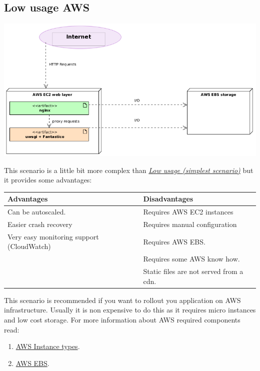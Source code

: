 \documentclass[letterpaper,10pt,english]{sphinxmanual}
\begin{document}
\subsection{Low usage AWS}
\label{how_to/deployment/aws_low_usage_scenario:low-usage-aws}\label{how_to/deployment/aws_low_usage_scenario::doc}
\includegraphics{low_usage_aws.png}

This scenario is a little bit more complex than {\hyperref[how_to/deployment/low_usage_scenario::doc]{\emph{Low usage (simplest scenario)}}} but it provides some
advantages:

\begin{tabulary}{\linewidth}{|L|L|}
\hline
\textbf{\relax 
Advantages
} & \textbf{\relax 
Disadvantages
}\\\hline

Can be autoscaled.
 & 
Requires AWS EC2 instances
\\\hline

Easier crash recovery
 & 
Requires manual configuration
\\\hline

Very easy monitoring support (CloudWatch)
 & 
Requires AWS EBS.
\\\hline
 & 
Requires some AWS know how.
\\\hline
 & 
Static files are not served from a cdn.
\\\hline
\end{tabulary}


This scenario is recommended if you want to rollout you application on AWS infrastructure. Usually it is non expensive
to do this as it requires micro instances and low cost storage. For more information about AWS required components
read:
\begin{enumerate}
\item {} 
\href{http://aws.amazon.com/ec2/instance-types/}{AWS Instance types}.

\item {} 
\href{http://aws.amazon.com/ebs/}{AWS EBS}.

\end{enumerate}
\end{document}
